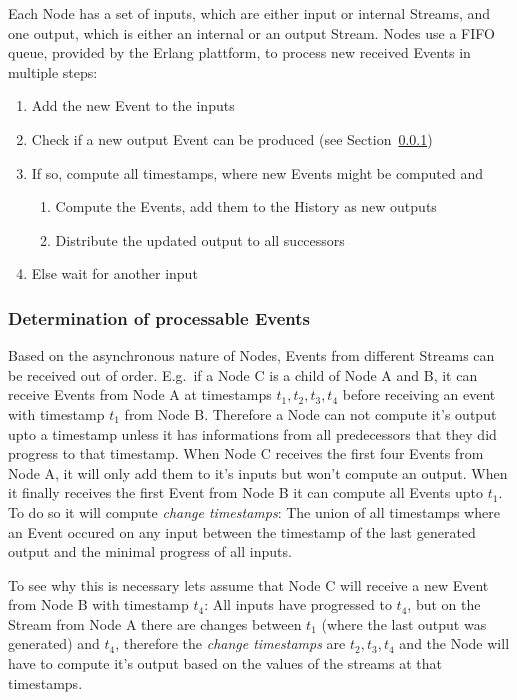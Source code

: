 Each Node has a set of inputs, which are either input or internal Streams, and one output, which is either an internal or an output Stream.
Nodes use a FIFO queue, provided by the Erlang plattform, to process new received Events in multiple steps:

\begin{enumerate}
  \item Add the new Event to the inputs
  \item Check if a new output Event can be produced (see Section~\ref{sec:concepts:defs:nodes:processable})
  \item If so, compute all timestamps, where new Events might be computed and
    \begin{enumerate}
      \item Compute the Events, add them to the History as new outputs
      \item Distribute the updated output to all successors
    \end{enumerate}
  \item Else wait for another input
\end{enumerate}

\subsubsection{Determination of processable Events}
\label{sec:concepts:defs:nodes:processable}

Based on the asynchronous nature of Nodes, Events from different Streams can be received out of order.
E.g.\ if a Node C is a child of Node A and B, it can receive Events from Node A at timestamps \(t_1, t_2, t_3, t_4\)
before receiving an event with timestamp \(t_1\) from Node B.
Therefore a Node can not compute it's output upto a timestamp unless it has informations from all predecessors that they did progress to that timestamp.
When Node C receives the first four Events from Node A, it will only add them to it's inputs but won't compute an output.
When it finally receives the first Event from Node B it can compute all Events upto \(t_1\).
To do so it will compute \emph{change timestamps}: The union of all timestamps where an Event occured on any input between the timestamp of the last generated output and the minimal progress of all inputs.

To see why this is necessary lets assume that Node C will receive a new Event from Node B with timestamp \(t_4\):
All inputs have progressed to \(t_4\), but on the Stream from Node A there are changes between \(t_1\) (where the last output was generated) and \(t_4\),
therefore the \emph{change timestamps} are \(t_2, t_3, t_4\) and the Node will have to compute it's output based on the values of the streams at that timestamps.

